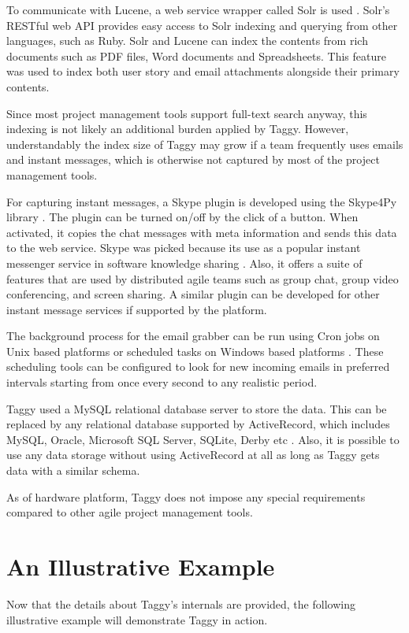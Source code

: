 To communicate with Lucene, a web service wrapper called Solr is used \cite{solr}. Solr's RESTful web API provides easy access to Solr indexing and querying from other languages, such as Ruby. Solr and Lucene can index the contents from rich documents such as PDF files, Word documents and Spreadsheets. This feature was used to index both user story and email attachments alongside their primary contents.

Since most project management tools support full-text search anyway, this indexing is not likely an additional burden applied by Taggy. However, understandably the index size of Taggy may grow if a team frequently uses emails and instant messages, which is otherwise not captured by most of the project management tools.

For capturing instant messages, a Skype plugin is developed using the Skype4Py library \cite{skype4py}. The plugin can be turned on/off by the click of a button. When activated, it copies the chat messages with meta information and sends this data to the web service. Skype was picked because its use as a popular instant messenger service in software knowledge sharing \cite{how_did_we}. Also, it offers a suite of features that are used by distributed agile teams such as group chat, group video conferencing, and screen sharing. A similar plugin can be developed for other instant message services if supported by the platform.

The background process for the email grabber can be run using Cron jobs on Unix based platforms or scheduled tasks on Windows based platforms \cite{cron, scheduled_tasks}. These scheduling tools can be configured to look for new incoming emails in preferred intervals starting from once every second to any realistic period.

Taggy used a MySQL relational database server to store the data. This can be replaced by any relational database supported by ActiveRecord, which includes MySQL, Oracle, Microsoft SQL Server, SQLite, Derby etc \cite{active_record}. Also, it is possible to use any data storage without using ActiveRecord at all as long as Taggy gets data with a similar schema.

As of hardware platform, Taggy does not impose any special requirements compared to other agile project management tools.

\section{An Illustrative Example}	
Now that the details about Taggy's internals are provided, the following illustrative example will demonstrate Taggy in action.

